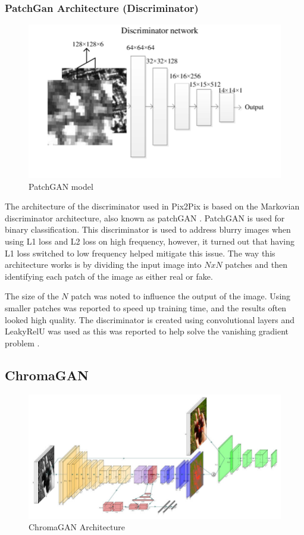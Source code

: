 \subsubsection*{PatchGan Architecture (Discriminator)}
\begin{figure}[H]
    \centering
    \includegraphics[width=0.7\columnwidth]{sections/figures/PatchGAN.png}
    \caption{PatchGAN model \cite{ao_2018}}
    \label{fig:my_label}
\end{figure}
The architecture of the discriminator used in Pix2Pix is based on the Markovian discriminator architecture, also known as patchGAN \cite{etal_2018}. PatchGAN is used for binary classification. This discriminator is used to address blurry images when using L1 loss and L2 loss on high frequency, however, it turned out that having L1 loss switched to low frequency helped mitigate this issue. The way this architecture works is by dividing the input image into \(N x N\) patches and then identifying each patch of the image as either real or fake. 

The size of the \(N\) patch was noted to influence the output of the image. Using smaller patches was reported to speed up training time, and the results often looked high quality. 
The discriminator is created using convolutional layers and LeakyRelU was used as this was reported to help solve the vanishing gradient problem \cite{brownlee_2020}. 





\newpage
\subsection{ChromaGAN}

\begin{figure}[H]
    \centering
    \includegraphics[width=1\columnwidth]{sections/figures/ChromaGAN_architecture.png}
    \caption{ChromaGAN Architecture}
    \label{fig:my_label}
\end{figure}


